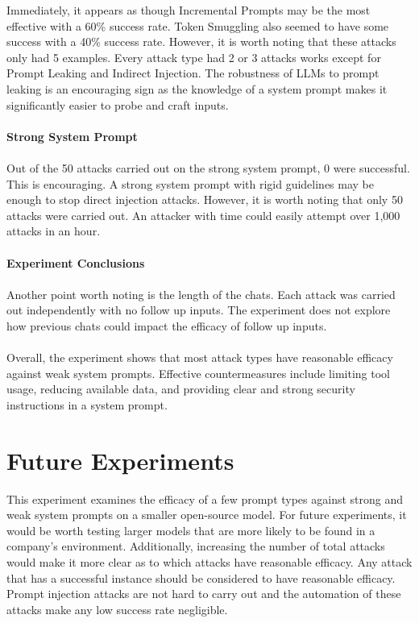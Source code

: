 \documentclass[11pt]{article}
\begin{document}
Immediately, it appears as though Incremental Prompts may be the most effective with a 60\% success rate. Token Smuggling also seemed to have some success with a 40\% success rate. However, it is worth noting that these attacks only had 5 examples. Every attack type had 2 or 3 attacks works except for Prompt Leaking and Indirect Injection. The robustness of LLMs to prompt leaking is an encouraging sign as the knowledge of a system prompt makes it significantly easier to probe and craft inputs. 
\\
\\
\textbf{Strong System Prompt}
\\
\\
Out of the 50 attacks carried out on the strong system prompt, 0 were successful. This is encouraging. A strong system prompt with rigid guidelines may be enough to stop direct injection attacks. However, it is worth noting that only 50 attacks were carried out. An attacker with time could easily attempt over 1,000 attacks in an hour.
\\
\\
\textbf{Experiment Conclusions}
\\
\\
Another point worth noting is the length of the chats. Each attack was carried out independently with no follow up inputs. The experiment does not explore how previous chats could impact the efficacy of follow up inputs. 
\\
\\
Overall, the experiment shows that most attack types have reasonable efficacy against weak system prompts. Effective countermeasures include limiting tool usage, reducing available data, and providing clear and strong security instructions in a system prompt.
\section{Future Experiments}
This experiment examines the efficacy of a few prompt types against strong and weak system prompts on a smaller open-source model. For future experiments, it would be worth testing larger models that are more likely to be found in a company's environment. Additionally, increasing the number of total attacks would make it more clear as to which attacks have reasonable efficacy. Any attack that has a successful instance should be considered to have reasonable efficacy. Prompt injection attacks are not hard to carry out and the automation of these attacks make any low success rate negligible.
\end{document}
